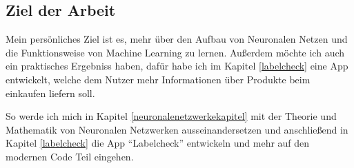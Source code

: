 \subsection{Ziel der Arbeit}

Mein persönliches Ziel ist es, mehr über den Aufbau von Neuronalen Netzen und die Funktionsweise von Machine Learning zu lernen. Außerdem möchte ich auch ein praktisches Ergebniss haben, dafür habe ich im Kapitel \ref{labelcheck} eine App entwickelt, welche dem Nutzer mehr Informationen über Produkte beim einkaufen liefern soll.

So werde ich mich in Kapitel \ref{neuronalenetzwerkekapitel} mit der Theorie und Mathematik von Neuronalen Netzwerken ausseinandersetzen und anschließend in Kapitel \ref{labelcheck} die App "`Labelcheck"' entwickeln und mehr auf den modernen Code Teil eingehen.